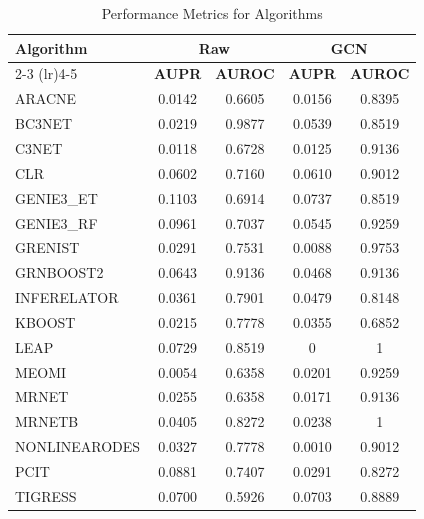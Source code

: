 \documentclass{article}
\begin{document}
\begin{table}[h!]
\centering
\caption{Performance Metrics for Algorithms}
\begin{tabular}{@{}lcccc@{}}
\toprule
\textbf{Algorithm} & \multicolumn{2}{c}{\textbf{Raw}} & \multicolumn{2}{c}{\textbf{GCN}} \\ \cmidrule(lr){2-3} \cmidrule(lr){4-5}
                   & \textbf{AUPR} & \textbf{AUROC}   & \textbf{AUPR} & \textbf{AUROC}   \\ \midrule
ARACNE        & 0.0142        & 0.6605           & 0.0156        & 0.8395           \\
BC3NET        & 0.0219        & 0.9877           & 0.0539        & 0.8519           \\
C3NET         & 0.0118        & 0.6728           & 0.0125        & 0.9136           \\
CLR           & 0.0602        & 0.7160           & 0.0610        & 0.9012           \\
GENIE3\_ET    & 0.1103        & 0.6914           & 0.0737        & 0.8519           \\
GENIE3\_RF    & 0.0961        & 0.7037           & 0.0545        & 0.9259           \\
GRENIST       & 0.0291        & 0.7531           & 0.0088        & 0.9753           \\
GRNBOOST2     & 0.0643        & 0.9136           & 0.0468        & 0.9136           \\
INFERELATOR   & 0.0361        & 0.7901           & 0.0479        & 0.8148           \\
KBOOST        & 0.0215        & 0.7778           & 0.0355        & 0.6852           \\
LEAP          & 0.0729        & 0.8519           & 0             & 1                \\
MEOMI         & 0.0054        & 0.6358           & 0.0201        & 0.9259           \\
MRNET         & 0.0255        & 0.6358           & 0.0171        & 0.9136           \\
MRNETB        & 0.0405        & 0.8272           & 0.0238        & 1                \\
NONLINEARODES & 0.0327        & 0.7778           & 0.0010        & 0.9012           \\
PCIT          & 0.0881        & 0.7407           & 0.0291        & 0.8272           \\
TIGRESS       & 0.0700        & 0.5926           & 0.0703        & 0.8889           \\

\end{tabular}
\end{table}
\end{document}
